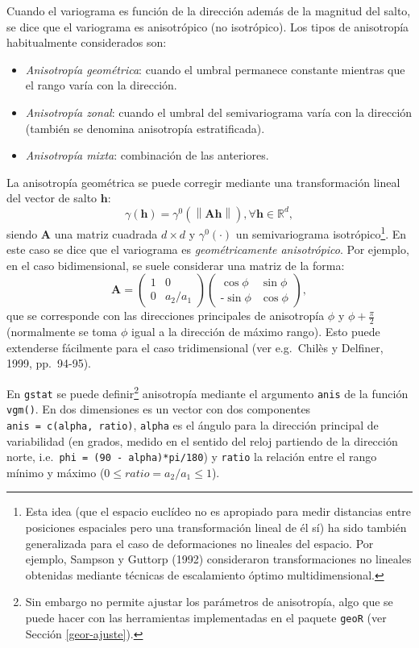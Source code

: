 \documentclass[
  spanish,
]{book}
\providecommand{\tightlist}{%
  \setlength{\itemsep}{0pt}\setlength{\parskip}{0pt}}
\theoremstyle{break}
\theoremstyle{definition}
\theoremstyle{definition}
\theoremstyle{definition}
\theoremstyle{definition}
\theoremstyle{remark}
\begin{document}
Cuando el variograma es función de la dirección además de la magnitud del salto, se dice que el variograma es anisotrópico (no isotrópico).
Los tipos de anisotropía habitualmente considerados son:

\begin{itemize}
\tightlist
\item
  \emph{Anisotropía geométrica}: cuando el umbral permanece constante mientras que el rango varía con la dirección.
\item
  \emph{Anisotropía zonal}: cuando el umbral del semivariograma varía con la dirección (también se denomina anisotropía estratificada).
\item
  \emph{Anisotropía mixta}: combinación de las anteriores.
\end{itemize}

La anisotropía geométrica se puede corregir mediante una transformación lineal del vector de salto \(\mathbf{h}\):
\[\gamma(\mathbf{h})=\gamma^{0} \left( \left\| \mathbf{A}\mathbf{h}\right\| \right) ,\forall \mathbf{h}\in \mathbb{R}^{d},\]
siendo \(\mathbf{A}\) una matriz cuadrada \(d\times d\) y \(\gamma^{0} (\cdot)\) un semivariograma isotrópico\footnote{Esta idea (que el espacio euclídeo no es apropiado para medir distancias entre posiciones espaciales pero una transformación lineal de él sí) ha sido también generalizada para el caso de deformaciones no lineales del espacio. Por ejemplo, Sampson y Guttorp (1992) consideraron transformaciones no lineales obtenidas mediante técnicas de escalamiento óptimo multidimensional.}.
En este caso se dice que el variograma es \emph{geométricamente anisotrópico}.
Por ejemplo, en el caso bidimensional, se suele considerar una matriz de la forma:
\[\mathbf{A}=\left( 
\begin{array}{cc}
1  & 0 \\
0 & a_2/a_1 
\end{array}
\right) \left( 
\begin{array}{cc}
\cos \phi  & \sin\phi  \\
\text{-} \sin\phi  & \cos \phi 
\end{array}
\right),\]
que se corresponde con las direcciones principales de anisotropía \(\phi\) y \(\phi + \frac{\pi }{\text{2}}\) (normalmente se toma \(\phi\) igual a la dirección de máximo rango).
Esto puede extenderse fácilmente para el caso tridimensional (ver e.g.~Chilès y Delfiner, 1999, pp.~94-95).

En \texttt{gstat} se puede definir\footnote{Sin embargo no permite ajustar los parámetros de anisotropía, algo que se puede hacer con las herramientas implementadas en el paquete \texttt{geoR} (ver Sección \ref{geor-ajuste}).} anisotropía mediante el argumento \texttt{anis} de la función \texttt{vgm()}.
En dos dimensiones es un vector con dos componentes \texttt{anis\ =\ c(alpha,\ ratio)}, \texttt{alpha} es el ángulo para la dirección principal de variabilidad (en grados, medido en el sentido del reloj partiendo de la dirección norte, i.e.~\texttt{phi\ =\ (90\ -\ alpha)*pi/180}) y \texttt{ratio} la relación entre el rango mínimo y máximo (\(0 \leq ratio = a_2/a_1 \leq 1\)).
\end{document}
